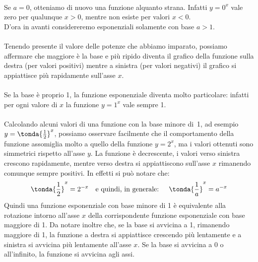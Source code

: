 \paragraph{} Se $a=0$, otteniamo di nuovo una funzione alquanto strana. Infatti $y = 0^x$ vale
zero per qualunque $x>0$, mentre non esiste per valori $x<0$.\\[4pt]

D'ora in avanti considereremo esponenziali solamente con base $a>1$.

\paragraph{}
Tenendo presente il valore delle potenze che abbiamo imparato, possiamo 
affermare che maggiore è la base e più ripido diventa il grafico della funzione 
sulla destra (per valori positivi) mentre a sinistra (per valori negativi) il 
grafico si appiattisce più rapidamente sull'asse \(x\).
\paragraph{}
Se la base è proprio 1, la funzione esponenziale 
diventa molto particolare: infatti per ogni valore di $x$ la funzione \(y=1^x\) vale sempre 1.
\paragraph{}
Calcolando alcuni valori di una funzione con la base minore di~1, 
ad esempio \(y=\tonda{\frac{1}{2}}^x\), possiamo osservare facilmente che il 
comportamento della funzione assomiglia molto a quello della funzione
\(y=2^x\), ma i valori ottenuti sono simmetrici rispetto all'asse \(y\). 
La funzione è decrescente, i valori verso sinistra crescono rapidamente, mentre 
verso destra si appiattiscono sull'asse \(x\) rimanendo comunque sempre 
positivi. In effetti si può notare che:
\[\tonda{\frac{1}{2}}^x = 2^{-x} \quad \text{e quindi, in generale: }\quad \tonda{\frac{1}{a}}^x = a^{-x}\]
Quindi una funzione esponenziale con base minore di 1 è equivalente alla rotazione intorno all'asse $x$ della
corrispondente funzione esponenziale con base maggiore di 1. Da notare inoltre che, se la base si avvicina
a 1, rimanendo maggiore di 1, la funzione a destra si 
appiattisce crescendo più lentamente e a sinistra si avvicina più 
lentamente all'asse \(x\). Se la base si avvicina a 0 o all'infinito, la funzione si avvicina agli assi.

